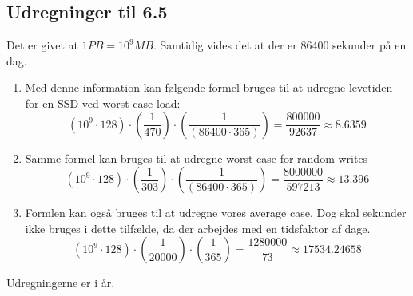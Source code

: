 \subsection{Udregninger til 6.5}
Det er givet at $1PB=10^9MB$. Samtidig vides det at der er 86400 sekunder på en dag.
\begin{enumerate}
    \item {
        Med denne information kan følgende formel bruges til at udregne levetiden for en SSD ved worst case load:
        \begin{equation}
            \left(10^9\cdot 128\right)\cdot\left(\frac{1}{470}\right)\cdot\left(\frac{1}{\left(86400\cdot 365\right)}\right) = \frac{800000}{92637} \approx 8.6359
        \end{equation}
    }
    \item {
        Samme formel kan bruges til at udregne worst case for random writes
        \begin{equation}
            \left(10^9\cdot 128\right)\cdot\left(\frac{1}{303}\right)\cdot\left(\frac{1}{\left(86400\cdot 365\right)}\right) = \frac{8000000}{597213} \approx 13.396
        \end{equation}
    }
    \item {
        Formlen kan også bruges til at udregne vores average case. 
        Dog skal sekunder ikke bruges i dette tilfælde, da der arbejdes med en tidsfaktor af dage.
        \begin{equation}
            \left(10^9\cdot 128\right)\cdot\left(\frac{1}{20000}\right)\cdot\left(\frac{1}{365}\right) = \frac{1280000}{73} \approx 17534.24658
        \end{equation}
    }
\end{enumerate}
Udregningerne er i år.